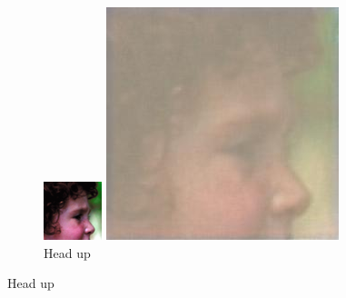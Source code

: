 \documentclass[11pt,twocolumn,twoside,paper=a4]{IEEEtran}
\begin{document}
\begin{figure}[ht]
\par\bigskip

\begin{subfigure}{0.45\textwidth}
  \centering
  \begin{minipage}[b]{0.45\textwidth}
    \includegraphics[width=\textwidth]{../images/head_low.jpg}
    \caption{Head low}
    \label{fig:head_low}
  \end{minipage}
  \hfill
  \begin{minipage}[b]{0.45\textwidth}
    \includegraphics[width=\textwidth]{../images/head_up.jpg}
    \caption{Head up}
    \label{fig:head_up}
  \end{minipage}
\end{subfigure}

\end{figure}
\end{document}
